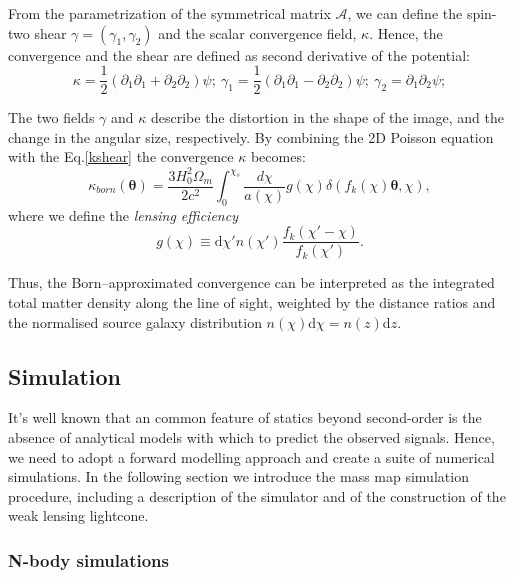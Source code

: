 \documentclass[twocolumn,twocolappendix]{aastex63}
\begin{document}
From the parametrization of the symmetrical matrix $\mathcal{A}$, we can define the spin-two shear $\gamma=(\gamma_1,\gamma_2)$ and the scalar convergence field, $\kappa$. 
Hence, the convergence and the shear are defined as second derivative of the potential:
\begin{equation}\label{kshear}
    \kappa=\frac{1}{2}(\partial_1\partial_1+\partial_2\partial_2)\psi; \ \gamma_1=\frac{1}{2}(\partial_1\partial_1-\partial_2\partial_2)\psi; \ 
    \gamma_2=\partial_1\partial_2\psi;
\end{equation}

The two fields $\gamma$ and $\kappa$ describe the distortion in the shape of the image, and the change in the angular size, respectively.
By combining the 2D Poisson equation with the Eq.\ref{kshear} the convergence $\kappa$ becomes:
\begin{equation}
    \kappa_{born}(\boldsymbol{\theta})= \frac{3H_0^2 \Omega_m}{2c^2}
    \int_0^{\chi_s} 
    \frac{d\chi}{a(\chi)}
    g(\chi)
    \delta(f_k(\chi)\boldsymbol{\theta},\chi),
\end{equation}
where we define the \textit{lensing efficiency}
\begin{equation}
   g(\chi) \equiv
   \text{d}\chi'
   n(\chi')
    \frac{f_k(\chi'-\chi)}{f_k(\chi')}.
\end{equation}


Thus, the Born–approximated convergence can be interpreted as the integrated total matter density along the line of sight, weighted by the distance ratios and the normalised source galaxy  distribution $n(\chi)$d$\chi=n(z)$d$z$.


\subsection{Simulation}
It's well known that an common feature of statics beyond second-order is the absence of analytical models with which to predict the observed signals. Hence, we need to adopt a forward modelling approach and create a suite of numerical simulations. 
In the following section we introduce the mass map simulation procedure, including a description of the simulator and of the construction of the weak lensing lightcone.

\subsubsection{N-body simulations}
\end{document}
